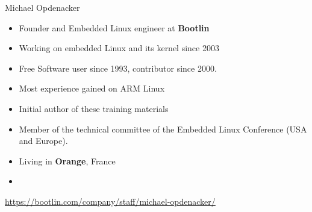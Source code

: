 \begin{frame}{Michael Opdenacker}
    \begin{itemize}
	\item Founder and Embedded Linux engineer at {\bf Bootlin}
	\item Working on embedded Linux and its kernel since 2003
	\item Free Software user since 1993, contributor since 2000.
	\item Most experience gained on ARM Linux
	\item Initial author of these training materials
	\item Member of the technical committee of the Embedded Linux
	      Conference (USA and Europe).
	\item Living in {\bf Orange}, France
	\item {}
    \end{itemize}
    {\small \url{https://bootlin.com/company/staff/michael-opdenacker/}}
\end{frame}
